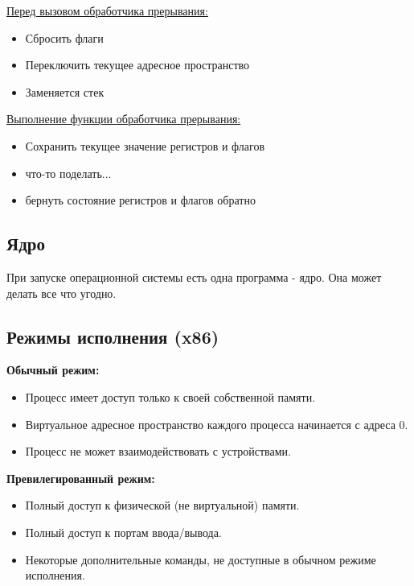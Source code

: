 \begin{multicols}{2}
      \underline{Перед вызовом обработчика прерывания:}
      \begin{itemize}
        \item Сбросить флаги
        \item Переключить текущее адресное пространство
        \item Заменяется стек
      \end{itemize}
      
      \underline{Выполнение функции обработчика прерывания:}
      \begin{itemize}
        \item Сохранить текущее значение регистров и флагов
        \item что-то поделать...
        \item бернуть состояние регистров и флагов обратно
      \end{itemize}
      
      \subsection*{Ядро}
      
      При запуске операционной системы есть одна программа - ядро. Она может делать все что угодно.
      
      \subsection*{Режимы исполнения (x86)}
      
      \textbf{Обычный режим:}
      \begin{itemize}
        \item Процесс имеет доступ только к своей собственной памяти.
        \item Виртуальное адресное пространство каждого процесса начинается с адреса 0.
        \item Процесс не может взаимодействовать с устройствами.
      \end{itemize}
      
      \textbf{Превилегированный режим:}
      \begin{itemize}
        \item Полный доступ к физической (не виртуальной) памяти.
        \item Полный доступ к портам ввода/вывода.
        \item Некоторые дополнительные команды, не доступные в обычном режиме исполнения.
      \end{itemize}
      

\end{multicols}
